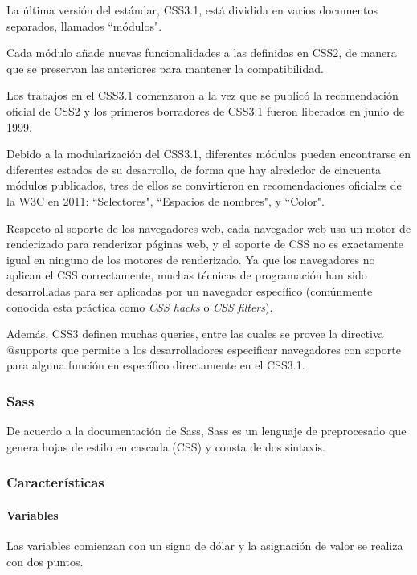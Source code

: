 La última versión del estándar, CSS3.1, está dividida en varios documentos separados, llamados ``módulos".


Cada módulo añade nuevas funcionalidades a las definidas en CSS2, de manera que se preservan las anteriores para mantener la compatibilidad.


Los trabajos en el CSS3.1 comenzaron a la vez que se publicó la recomendación oficial de CSS2 y los primeros borradores de CSS3.1 fueron liberados en junio de 1999.


Debido a la modularización del CSS3.1, diferentes módulos pueden encontrarse en diferentes estados de su desarrollo,​ de forma que hay alrededor de cincuenta módulos publicados,​ tres de ellos se convirtieron en recomendaciones oficiales de la W3C en 2011: ``Selectores", ``Espacios de nombres", y ``Color".


Respecto al soporte de los navegadores web, cada navegador web usa un motor de renderizado para renderizar páginas web, y el soporte de CSS no es exactamente igual en ninguno de los motores de renderizado. Ya que los navegadores no aplican el CSS correctamente, muchas técnicas de programación han sido desarrolladas para ser aplicadas por un navegador específico (comúnmente conocida esta práctica como \textit{CSS hacks} o \textit{CSS filters}).


Además, CSS3 definen muchas queries, entre las cuales se provee la directiva @supports que permite a los desarrolladores especificar navegadores con soporte para alguna función en específico directamente en el CSS3.1​. 

\subsubsection*{Sass}

De acuerdo a la documentación de Sass\cite{noauthor_documentation_nodate}, Sass es un lenguaje de preprocesado que genera hojas de estilo en cascada (CSS) y consta de dos sintaxis.

\subsubsection*{Características}

\paragraph*{Variables}
Las variables comienzan con un signo de dólar y la asignación de valor se realiza con dos puntos.

